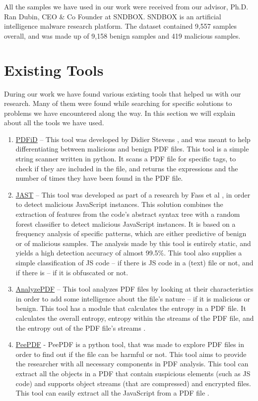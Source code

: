 \documentclass{article}
\begin{document}
\indent All the samples we have used in our work were received from our advisor, Ph.D. Ran Dubin, CEO \& Co Founder at SNDBOX. SNDBOX is an artificial intelligence malware research platform. The dataset contained 9,557 samples overall, and was made up of 9,158 benign samples and 419 malicious samples.

\section{Existing Tools}
\indent During our work we have found various existing tools that helped us with our research. Many of them were found while searching for specific solutions to problems we have encountered along the way. In this section we will explain about all the tools we have used.
\begin{enumerate}
	\item \underline{PDFiD} – This tool was developed by Didier Stevens \cite{1}, and was meant to help differentiating between malicious and benign PDF files. This tool is a simple string scanner written in python. It scans a PDF file for specific tags, to check if they are included in the file, and returns the expressions and the number of times they have been found in the PDF file.
	\item \underline{JAST} – This tool was developed as part of a research by Fass et al \cite{JAST2018}, in order to detect malicious JavaScript instances. This solution combines the extraction of features from the code’s abstract syntax tree with a random forest classifier to detect malicious JavaScript instances. It is based on a frequency analysis of specific patterns, which are either predictive of benign or of malicious samples. The analysis made by this tool is entirely static, and yields a high detection accuracy of almost 99.5\%. This tool also supplies a simple classification of JS code – if there is JS code in a (text) file or not, and if there is – if it is obfuscated or not.
	\item \underline{AnalyzePDF} – This tool analyzes PDF files by looking at their characteristics in order to add some intelligence about the file's nature – if it is malicious or benign. This tool has a module that calculates the entropy in a PDF file. It calculates the overall entropy, entropy within the streams of the PDF file, and the entropy out of the PDF file's streams \cite{AnalyzePDF2014}.
	\item \underline{PeePDF} - PeePDF is a python tool, that was made to explore PDF files in order to find out if the file can be harmful or not. This tool aims to provide the researcher with all necessary components in PDF analysis. This tool can extract all the objects in a PDF that contain suspicious elements (such as JS code) and supports object streams (that are compressed) and encrypted files. This tool can easily extract all the JavaScript from a PDF file \cite{Peepdf2016}.
\end{enumerate}
\end{document}
